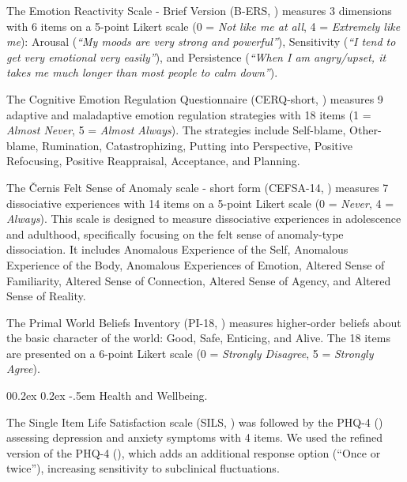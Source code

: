 \documentclass[
  jou,
  floatsintext,
  longtable,
  nolmodern,
  notxfonts,
  notimes,
  colorlinks=true,linkcolor=blue,citecolor=blue,urlcolor=blue]{apa7}
\makeatletter
\renewcommand{\paragraph}{\@startsection{paragraph}{4}{\parindent}%
	{0\baselineskip \@plus 0.2ex \@minus 0.2ex}%
	{-.5em}%
	{\normalfont\normalsize\bfseries\typesectitle}}
\makeatother
\begin{document}
The Emotion Reactivity Scale - Brief Version (B-ERS,
) measures
3 dimensions with 6 items on a 5-point Likert scale (0 = \emph{Not like
me at all}, 4 = \emph{Extremely like me}): Arousal (\emph{``My moods are
very strong and powerful''}), Sensitivity (\emph{``I tend to get very
emotional very easily''}), and Persistence (\emph{``When I am
angry/upset, it takes me much longer than most people to calm down''}).

The Cognitive Emotion Regulation Questionnaire (CERQ-short,
)
measures 9 adaptive and maladaptive emotion regulation strategies with
18 items (1 = \emph{Almost Never}, 5 = \emph{Almost Always}). The
strategies include Self-blame, Other-blame, Rumination, Catastrophizing,
Putting into Perspective, Positive Refocusing, Positive Reappraisal,
Acceptance, and Planning.

The Černis Felt Sense of Anomaly scale - short form (CEFSA-14,
) measures 7
dissociative experiences with 14 items on a 5-point Likert scale (0 =
\emph{Never}, 4 = \emph{Always}). This scale is designed to measure
dissociative experiences in adolescence and adulthood, specifically
focusing on the felt sense of anomaly-type dissociation. It includes
Anomalous Experience of the Self, Anomalous Experience of the Body,
Anomalous Experiences of Emotion, Altered Sense of Familiarity, Altered
Sense of Connection, Altered Sense of Agency, and Altered Sense of
Reality.

The Primal World Beliefs Inventory (PI-18,
) measures
higher-order beliefs about the basic character of the world: Good, Safe,
Enticing, and Alive. The 18 items are presented on a 6-point Likert
scale (0 = \emph{Strongly Disagree}, 5 = \emph{Strongly Agree}).

\paragraph{Health and Wellbeing.}\label{health-and-wellbeing}

The Single Item Life Satisfaction scale (SILS,
) was
followed by the PHQ-4 () assessing depression and anxiety symptoms with 4 items. We used
the refined version of the PHQ-4
(), which
adds an additional response option (``Once or twice''), increasing
sensitivity to subclinical fluctuations.
\end{document}
